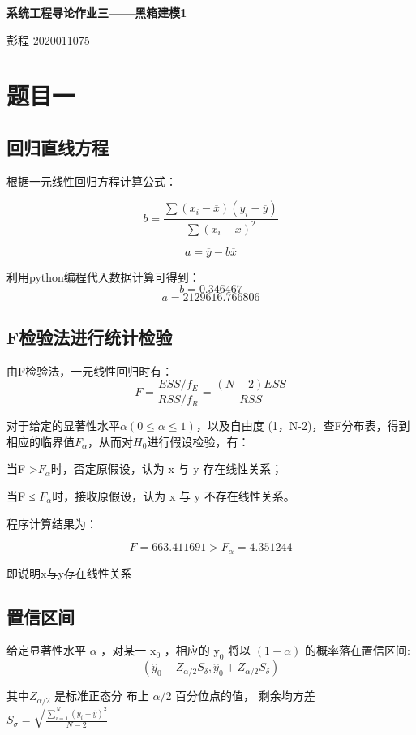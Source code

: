 \documentclass[UTF8]{ctexart}
\begin{document}
\begin{center}
  \textbf{\LARGE{系统工程导论作业三——黑箱建模1}}\\
\end{center}
\begin{center}
  \large{彭程 2020011075}
\end{center}
\section{题目一}

\subsection{回归直线方程}
根据一元线性回归方程计算公式：

$$
b = \frac{\sum (x_{i}-\overline{x})(y_{i}-\overline{y})}{\sum (x_{i}-\overline{x})^{2}}$$
 
$$
a = \overline{y}-b\overline{x}
$$

利用python编程代入数据计算可得到：
$$
b=0.346467
$$
$$
a=2129616.766806
$$

\subsection{F检验法进行统计检验}
由F检验法，一元线性回归时有：
$$
F=\frac{E S S / f_{E}}{R S S / f_{R}}=\frac{(N-2) E S S}{R S S}
$$


对于给定的显著性水平$\alpha(0 \leq \alpha \leq 1)$，以及自由度 (1，N-2)，查F分布表，得到相应的临界值$F_\alpha$，从而对$H_0$进行假设检验，有：

当F >$F_\alpha$时，否定原假设，认为 x 与 y 存在线性关系；

当F ≤ $F_\alpha$时，接收原假设，认为 x 与 y 不存在线性关系。

程序计算结果为：

$$
F = 663.411691 > F_\alpha = 4.351244
$$

即说明x与y存在线性关系


\subsection{置信区间}

给定显著性水平  $\alpha$  ，对某一  $\mathrm{x}_{0}$  ，相应的 $ \mathrm{y}_{0}$  将以  $(1-\alpha) $ 的概率落在置信区间:
$$
\left(\hat{y}_{0}-Z_{\alpha / 2} S_{\delta}, \hat{y}_{0}+Z_{\alpha / 2} S_{\delta}\right)
$$

其中$Z_{\alpha / 2}$  是标准正态分 布上  $\alpha / 2$  百分位点的值，
剩余均方差$S_{\sigma}=\sqrt{\frac{\sum_{i=1}^{N}\left(y_{i}-\hat{y}\right)^{2}}{N-2}}$
\end{document}
